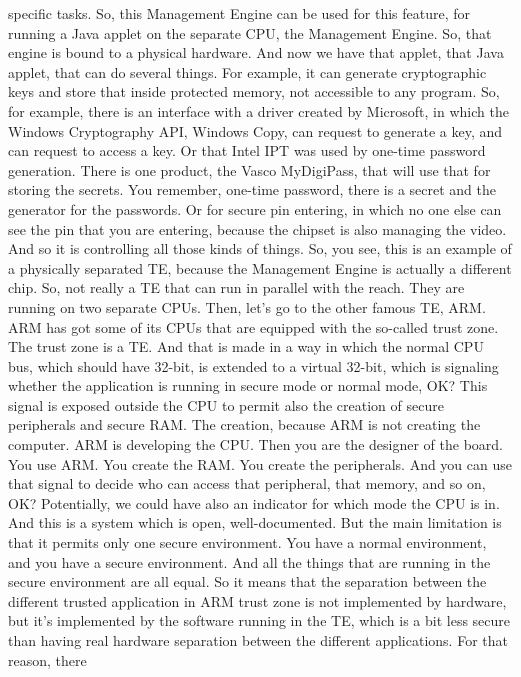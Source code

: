  specific tasks. So, this Management Engine can be used for this feature, for
 running a Java applet on the separate CPU, the Management Engine. So, that
 engine is bound to a physical hardware. And now we have that applet, that Java
 applet, that can do several things. For example, it can generate cryptographic
 keys and store that inside protected memory, not accessible to any program.
 So, for example, there is an interface with a driver created by Microsoft, in
 which the Windows Cryptography API, Windows Copy, can request to generate a
 key, and can request to access a key. Or that Intel IPT was used by one-time
 password generation. There is one product, the Vasco MyDigiPass, that will use
 that for storing the secrets. You remember, one-time password, there is a
 secret and the generator for the passwords. Or for secure pin entering, in
 which no one else can see the pin that you are entering, because the chipset
 is also managing the video. And so it is controlling all those kinds of
 things. So, you see, this is an example of a physically separated TE, because
 the Management Engine is actually a different chip. So, not really a TE that
 can run in parallel with the reach. They are running on two separate CPUs.
 Then, let's go to the other famous TE, ARM. ARM has got some of its CPUs that
 are equipped with the so-called trust zone. The trust zone is a TE. And that
 is made in a way in which the normal CPU bus, which should have 32-bit, is
 extended to a virtual 32-bit, which is signaling whether the application is
 running in secure mode or normal mode, OK? This signal is exposed outside the
 CPU to permit also the creation of secure peripherals and secure RAM. The
 creation, because ARM is not creating the computer. ARM is developing the CPU.
 Then you are the designer of the board. You use ARM. You create the RAM. You
 create the peripherals. And you can use that signal to decide who can access
 that peripheral, that memory, and so on, OK? Potentially, we could have also
 an indicator for which mode the CPU is in. And this is a system which is open,
 well-documented. But the main limitation is that it permits only one secure
 environment. You have a normal environment, and you have a secure environment.
 And all the things that are running in the secure environment are all equal.
 So it means that the separation between the different trusted application in
 ARM trust zone is not implemented by hardware, but it's implemented by the
 software running in the TE, which is a bit less secure than having real
 hardware separation between the different applications. For that reason, there
